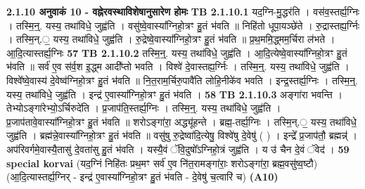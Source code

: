 \documentclass[17pt]{extarticle}
\begin{document}
                \textbf{ 2.1.10    अनुवाकं   10 - वह्नेरवस्थाविशेषानुसारेण होमः} \newline
                                \textbf{ TB 2.1.10.1} \newline
                  यद॒ग्नि-मु॒द्धर॑ति । वस॑व॒स्तर्ह्य॒ग्निः । तस्मि॒न्॒. यस्य॒ तथा॑विधे॒ जुह्व॑ति । वसु॑ष्वे॒वास्या᳚ग्निहो॒त्रꣳ हु॒तं भ॑वति ॥ निहि॑तो धूपा॒यञ्छे॑ते । रु॒द्रास्तह्य॒र्ग्निः । तस्मि॒न्.॒ यस्य॒ तथा॑विधे॒ जुह्व॑ति । रु॒द्रेष्वे॒वास्या᳚ग्निहो॒त्रꣳ हु॒तं भ॑वति ॥ प्र॒थ॒ममि॒द्ध्मम॒र्चिरा ल॑भते । आ॒दि॒त्यास्तर्ह्य॒ग्निः \textbf{ 57} \newline
                  \newline
                                \textbf{ TB 2.1.10.2} \newline
                  तस्मि॒न्॒. यस्य॒ तथा॑विधे॒ जुह्व॑ति । आ॒दि॒त्येष्वे॒वास्या᳚ग्निहो॒त्रꣳ हु॒तं भ॑वति ॥ सर्व॑ ए॒व स॑र्व॒श इ॒द्ध्म आदी᳚प्तो भवति । विश्वे॑ दे॒वास्तह्य॒र्ग्निः । तस्मि॒न्॒. यस्य॒ तथा॑विधे॒ जुह्व॑ति । विश्वे᳚ष्वे॒वास्य॑ दे॒वेष्व॑ग्निहो॒त्रꣳ हु॒तं भ॑वति ॥ नि॒त॒राम॒र्चिरु॒पावै॑ति लोहि॒नीके॑व भवति । इन्द्र॒स्तर्ह्य॒ग्निः । तस्मि॒न्॒. यस्य॒ तथा॑विधे॒ जुह्व॑ति । इन्द्र॑ ए॒वास्या᳚ग्निहो॒त्रꣳ हु॒तं भ॑वति । \textbf{ 58} \newline
                  \newline
                                \textbf{ TB 2.1.10.3} \newline
                  अङ्गा॑रा भवन्ति । तेभ्योऽङ्गा॑रेभ्यो॒ऽर्चिरुदे॑ति । प्र॒जाप॑ति॒स्तर्ह्य॒ग्निः । तस्मि॒न्॒. यस्य॒ तथा॑विधे॒ जुह्व॑ति । प्र॒जाप॑तावे॒वास्या᳚ग्निहो॒त्रꣳ हु॒तं भ॑वति ॥ शरोऽङ्गा॑रा॒ अद्ध्यू॑हन्ते । ब्रह्म॒-तर्ह्य॒ग्निः । तस्मि॒न्.॒ यस्य॒ तथा॑विधे॒ जुह्व॑ति । ब्रह्म॑न्ने॒वास्या᳚ग्निहो॒त्रꣳ हु॒तं भ॑वति ॥ वसु॑षु रु॒द्रेष्वा॑दि॒त्येषु॒ विश्वे॑षु दे॒वेषु॑ ( ) । इन्द्रे᳚ प्र॒जाप॑तौ॒ ब्रह्मन्न्॑ । अप॑रिवर्गमे॒वास्यै॒तासु॑ दे॒वता॑सु हु॒तं भ॑वति । यस्यै॒वं ॅवि॒दुषो᳚ऽग्निहो॒त्रं जुह्व॑ति । य उ॑ चैन दे॒वं ॅवेद॑ । \textbf{ 59} \newline
                  \newline
                                                        \textbf{special korvai} \newline
              (यद॒ग्निं निहि॑तः प्रथ॒मꣳ सर्व॑ ए॒व नि॑त॒रामङ्गा॑राः॒ शरोऽङ्गा॑रा॒ ब्रह्म॒वसु॑ष्व॒ष्टौ) \newline
                                (आ॒दि॒त्यास्तर्ह्य॒ग्निर् - इन्द्र॑ ए॒वास्या᳚ग्निहो॒त्रꣳ हु॒तं भ॑वति - दे॒वेषु॑ च॒त्वारि॑ च) \textbf{(A10)} \newline \newline
\end{document}
